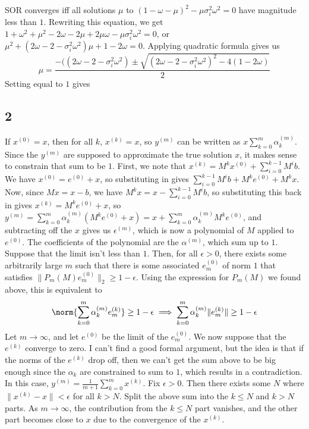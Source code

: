 \documentclass{article}
\newcommand{\ep}{\epsilon}
\begin{document}
SOR converges iff all solutions $\mu$ to $(1-\omega-\mu)^2-\mu\sigma_i^2\omega^2=0$ have magnitude less than $1$. Rewriting this equation, we get $1+\omega^2+\mu^2-2\omega-2\mu+2\mu\omega-\mu\sigma_i^2\omega^2=0$, or $\mu^2+(2\omega-2-\sigma_i^2\omega^2)\mu+1-2\omega=0$. Applying quadratic formula gives us 
\[\mu=\frac{-((2\omega-2-\sigma_i^2\omega^2)\pm\sqrt{(2\omega-2-\sigma_i^2\omega^2)^2-4(1-2\omega)}}{2}\]
Setting equal to $1$ gives %
\subsection*{2}
If $x^{(0)}=x$, then for all $k$, $x^{(k)}=x$, so $y^{(m)}$ can be written as $x\sum_{k=0}^m\alpha_k^{(m)}$. Since the $y^{(m)}$ are supposed to approximate the true solution $x$, it makes sense to constrain that sum to be $1$.
First, we note that $x^{(k)}=M^kx^{(0)}+\sum_{i=0}^{k-1}M^{i}b$. We have $x^{(0)}=e^{(0)}+x$, so substituting in gives $\sum_{i=0}^{k-1}M^{i}b+M^ke^{(0)}+M^kx$. Now, since $Mx=x-b$, we have $M^kx=x-\sum_{i=0}^{k-1}M^ib$, so substituting this back in gives $x^{(k)}=M^ke^{(0)}+x$, so $y^{(m)}=\sum_{k=0}^m\alpha_k^{(m)}(M^ke^{(0)}+x)=x+\sum_{k=0}^m\alpha_k^{(m)}M^ke^{(0)}$, and subtracting off the $x$ gives us $\ep^{(m)}$, which is now a polynomial of $M$ applied to $e^{(0)}$. The coefficients of the polynomial are the $\alpha^{(m)}$, which sum up to $1$.
Suppose that the limit isn't less than $1$. Then, for all $\ep>0$, there exists some arbitrarily large $m$ such that there is some associated $e_m^{(0)}$ of norm $1$ that satisfies $\|P_m(M)e_m^{(0)}\|_2\geq1-\ep$. Using the expression for $P_m(M)$ we found above, this is equivalent to 
\[\norm{\sum_{k=0}^m\alpha_k^{(m)}e_m^{(k)}}\geq1-\ep\implies\sum_{k=0}^m\alpha_k^{(m)}\|e_m^{(k)}\|\geq1-\ep\]
Let $m\to\infty$, and let $e^(0)$ be the limit of the $e_m^{(0)}$. We now suppose that the $e^{(k)}$ converge to zero. I can't find a good formal argument, but the idea is that if the norms of the $e^{(k)}$ drop off, then we can't get the sum above to be big enough since the $\alpha_k$ are constrained to sum to $1$, which results in a contradiction. %
In this case, $y^{(m)}=\frac{1}{m+1}\sum_{k=0}^mx^{(k)}$. Fix $\ep>0$. Then there exists some $N$ where $\|x^{(k)}-x\|<\ep$ for all $k>N$. Split the above sum into the $k\leq N$ and $k>N$ parts. As $m\to\infty$, the contribution from the $k\leq N$ part vanishes, and the other part becomes close to $x$ due to the convergence of the $x^{(k)}$.
\end{document}
